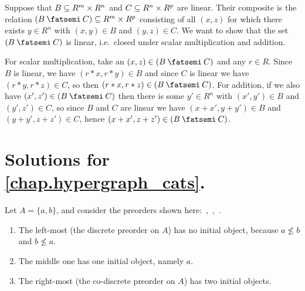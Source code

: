 \documentclass[7Sketches]{subfiles}
\begin{document}
{
Suppose that $B\ss R^m\times R^n$ and $C\ss R^n\times R^p$ are linear. Their composite is the relation $(B\cp C)\ss R^m\times R^p$ consisting of all $(x,z)$ for which there exists $y\in R^n$ with $(x,y)\in B$ and $(y,z)\in C$. We want to show that the set $(B\cp C)$ is linear, i.e.\ closed under scalar multiplication and addition.

For scalar multiplication, take an $(x,z)\in (B\cp C)$ and any $r\in R$. Since $B$ is linear, we have $(r*x,r*y)\in B$ and since $C$ is linear we have $(r*y,r*z)\in C$, so then $(r*x,r*z)\in (B\cp C)$. For addition, if we also have $(x',z')\in(B\cp C)$ then there is some $y'\in R^n$ with $(x',y')\in B$ and $(y',z')\in C$, so since $B$ and $C$ are linear we have $(x+x',y+y')\in B$ and $(y+y',z+z')\in C$, hence $(x+x',z+z')\in (B\cp C)$.
}
\finishSolutionChapter
\section[Solutions for Chapter 6]{Solutions for \cref{chap.hypergraph_cats}.}

{
Let $A=\{a,b\}$, and consider the preorders shown here: \,, \quad {}\,, \quad {}\,.
\begin{enumerate}
	\item The left-most (the discrete preorder on $A$) has no initial object, because $a\not\leq b$ and $b\not\leq a$.
	\item The middle one has one initial object, namely $a$.
	\item The right-most (the co-discrete preorder on $A$) has two initial objects.
\end{enumerate}
}
\end{document}
